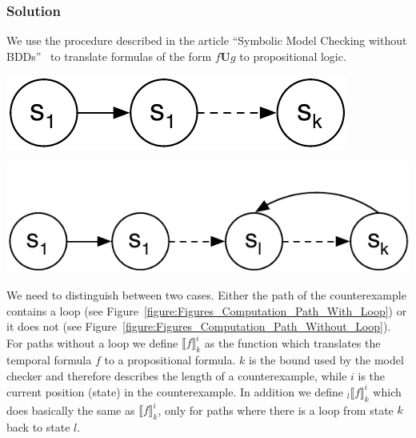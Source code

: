 \documentclass[a4paper, 12pt]{article}
\begin{document}
\subsubsection{Solution}

We use the procedure described in the article “Symbolic Model Checking without
BDDs”~\cite{Biere1999SymbolicModelChecking} to translate formulas of the form
$f\mathbf{U}g$ to propositional logic.

\begin{minipage}[t]{0.45\textwidth}
    \centering
    \vspace{0.7cm}
    \includegraphics[width=.72\textwidth]{Figures/Computation Path Without Loop}
    \label{figure:Figures_Computation_Path_Without_Loop}
\end{minipage}
\begin{minipage}[t]{0.45\textwidth}
    \centering
    \includegraphics[width=\textwidth]{Figures/Computation Path With Loop.pdf}
    \label{figure:Figures_Computation_Path_With_Loop}
\end{minipage}

We need to distinguish between two cases. Either the path of the
counterexample contains a loop (see
Figure~\ref{figure:Figures_Computation_Path_With_Loop}) or it does not (see
Figure~\ref{figure:Figures_Computation_Path_Without_Loop}). For paths without
a loop we define $⟦f⟧_k^i$ as the function which translates the temporal
formula $f$ to a propositional formula. $k$ is the bound used by the model
checker and therefore describes the length of a counterexample, while $i$ is
the current position (state) in the counterexample. In addition we define
$_l⟦f⟧_k^i$ which does basically the same as $⟦f⟧_k^i$, only for paths where
there is a loop from state $k$ back to state $l$.
\end{document}
